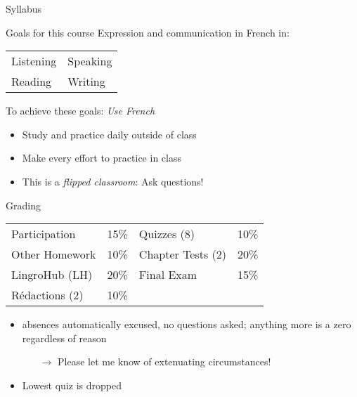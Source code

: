 \begin{frame}
  \begin{center}
    \Huge{Syllabus}
  \end{center}
\end{frame}

\begin{frame}{Goals for this course}
  Expression and communication in French in:
  \begin{center}
    \begin{tabular}{l l}
      Listening & Speaking \\
      Reading   & Writing \\
    \end{tabular}
  \end{center}
  To achieve these goals: \emph{Use French}
  \begin{itemize}
    \item Study and practice \alert{daily} outside of class
    \item Make every effort to practice in class
    \item This is a \emph{flipped classroom}: \alert{Ask questions!}
  \end{itemize}
\end{frame}

\begin{frame}{Grading}
  \begin{center}
    \begin{tabular}{l l | l l}
      Participation  & 15\% & Quizzes (8)       & 10\% \\
      Other Homework & 10\% & Chapter Tests (2) & 20\% \\
      LingroHub (LH) & 20\% & Final Exam        & 15\% \\
      Rédactions (2) & 10\% &                   &
    \end{tabular}
  \end{center}
  \begin{itemize}
    \item \absences{} absences automatically excused, no questions asked; anything more is a zero regardless of reason
    \begin{itemize}
      \item[$\to$] Please let me know of extenuating circumstances!
    \end{itemize}
    \item Lowest quiz is dropped
  \end{itemize}
\end{frame}

